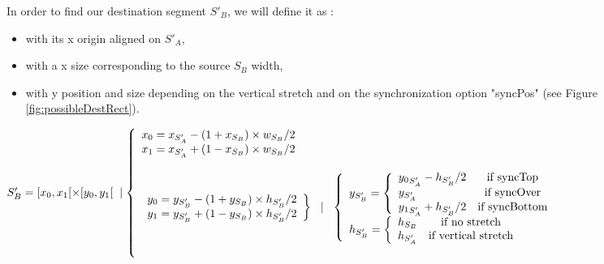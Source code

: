 \documentclass[a4paper]{article}
\begin{document}

In order to find our destination segment $S'_B$, we will define it as :
\begin{itemize}
  \item with its x origin aligned on $S'_A$,
  \item with a x size corresponding to the source $S_B$ width,
  \item with y position and size depending on the vertical stretch and on the synchronization option "syncPos" (see Figure \ref{fig:possibleDestRect}).
\end{itemize}


$S'_B = [{x_0} , {x_1}[ \times [{y_0} , {y_1}[  \hspace{2mm} \mid \left\lbrace 
\begin{array}{lcl} 
  x_0 = x_{S'_A} - ( 1 + x_{S_B} ) \times w_{S_B}/2 \\
  \bigskip
  x_1 = x_{S'_A} + ( 1 - x_{S_B} ) \times w_{S_B}/2 \\
  \bigskip
  \begin{array}{lcl}
    y_0 = y_{S'_B} - ( 1 + y_{S_B}) \times h_{S'_B}/2\\
    y_1 = y_{S'_B} + ( 1 - y_{S_B}) \times h_{S'_B}/2 
  \end{array}\bigg\} \hspace{2mm} \mid \hspace{2mm} \left\lbrace 
  \begin{array}{lcl}
    y _{S'_B} = \left\lbrace
    \begin{array}{lcl}
      {y_0}_{S'_A} - h_{S'_B}/2 & \text{if syncTop}\\ 
      y_{S'_A} & \text{if syncOver}\\
      {y_1}_{S'_A} +  h_{S'_B}/2 & \text{if syncBottom}
    \end{array}\right.\\
    h _{S'_B} = \left\lbrace 
    \begin{array}{lcl}
      h_{S_B} & \text{if no stretch}\\
      h_{S'_A} & \text{if vertical stretch}
    \end{array}\right.\\
  \end{array}\right.\\
\end{array}\right.$
\end{document}

